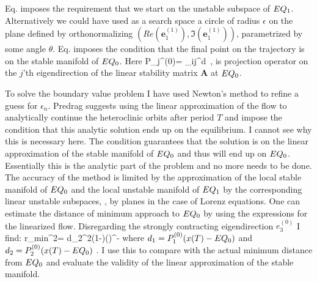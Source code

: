 Eq.  imposes the requirement that we start on the unstable subspace of $EQ_{1}$.
Alternatively we could have used as a search space a circle of radius $\epsilon$ on the plane defined
by orthonormalizing $\left(Re(\mathbf{e}_1^{(1)}),\Im(\mathbf{e}_1^{(1)})\right)$, parametrized by some
angle $\theta$. Eq.  imposes the condition that the final point on the trajectory is
on the stable manifold of $EQ_{0}$. Here
\beq
	P_j^{(0)}= \prod_{i\neq j}^d \,,
\eeq
is projection operator on the $j$'th eigendirection of the linear stability matrix $\mathbf{A}$ at $EQ_{0}$.

To solve the boundary value problem I have used Newton's method to refine a guess for $\epsilon_n$. %
Predrag suggests using the linear approximation of the flow to analytically continue the heteroclinic
orbits after period $T$ and impose the condition that this analytic solution ends up on the equilibrium.
I cannot see why this is necessary here. The condition  guarantees that the solution
is on the linear approximation of the stable manifold of $EQ_{0}$ and thus will end up on $EQ_{0}$.
Essentially this is the analytic part of the problem and no more needs to be done. The accuracy of the
method is limited by the approximation of the local stable manifold of $EQ_{0}$ and the local unstable
manifold of $EQ_{1}$ by the corresponding linear unstable subspaces, \ie, by planes in the case of Lorenz
equations. One can estimate the distance of minimum approach to $EQ_{0}$ by using the expressions for
the linearized flow. Disregarding the strongly contracting eigendirection $e_3^{(0)}$ I find:
\beq
	r_{min}^2= d_2^2\left(1-\right)\left(\-\right)^{-}
\eeq
where $d_1=P_1^{(0)} (x(T)-EQ_{0})$ and $d_2=P_2^{(0)} (x(T)-EQ_{0})$ . I use this to compare with the actual minimum distance from $EQ_{0}$ and
evaluate the validity of the linear approximation of the stable manifold.


